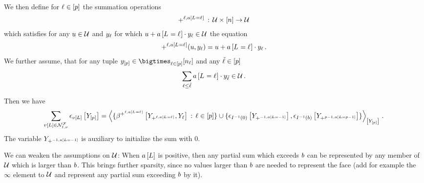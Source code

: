 We then define for $\ell\in[p]$ the summation operations
\begin{align*}
    +^{\ell,a\left[L_{}=\ell_{}\right]} \,:\, \mathcal{U} \times [n] \rightarrow \mathcal{U}
\end{align*}
which satisfies for any $u\in\mathcal{U}$ and $y_{\ell}$ for which $u + a\left[L_{}=\ell_{}\right] \cdot y_{\ell}\in\mathcal{U}$ the equation
\begin{align*}
    +^{\ell,a\left[L_{}=\ell_{}\right]}(u,y_{\ell})
    = u + a\left[L_{}=\ell_{}\right] \cdot y_{\ell} \, .
\end{align*}
We further assume, that for any tuple $\headindexof{[\seldim]}\in\headstates$ and any $\tilde{\ell}\in[p]$
\begin{align*}
    \sum_{\ell\leq\tilde{\ell}} a\left[L_{}=\ell_{}\right] \cdot y_{\tilde{\ell}} \in \mathcal{U} \, .
\end{align*}



Then we have
\begin{align*}
    \sum_{\imelementwith\in\genfaceimset} \onehotmapofat{\imelementwith}{\headvariables}
    = \contractionof{\{
        \bencodingofat{+^{\selindex,\normalvecat{\indexedselvariable}}}{
            \headvariableof{+^{\selindex,\normalvecat{\indexedselvariable}}},\headvariableof{\selindex}
        }
        \wcols\selindexin\}
        \cup \{\onehotmapofat{\invindexinterpretationat{0}}{\headvariableof{+^{-1,\normalvecat{\selvariable=-1}}}},
        \onehotmapofat{\invindexinterpretationat{\normalbound}}{\headvariableof{+^{\seldim-1,\normalvecat{\selvariable=\seldim-1}}}}\}
    }{\headvariables} \, .
\end{align*}
The variable $Y_{+^{-1,a\left[L=-1\right]}}$ is auxiliary to initialize the sum with $0$.

We can weaken the assumptions on $\mathcal{U}$:
When $a\left[L\right]$ is positive, then any partial sum which exceeds $b$ can be represented by any member of $\mathcal{U}$ which is larger than $b$.
This brings further sparsity, since no values larger than $b$ are needed to represent the face (add for example the $\infty$ element to $\mathcal{U}$ and represent any partial sum exceeding $b$ by it).


